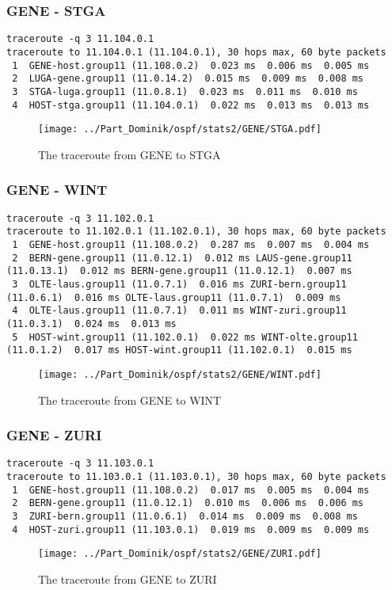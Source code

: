 \subsubsection{GENE - STGA}
\begin{lstlisting}
traceroute -q 3 11.104.0.1
traceroute to 11.104.0.1 (11.104.0.1), 30 hops max, 60 byte packets
 1  GENE-host.group11 (11.108.0.2)  0.023 ms  0.006 ms  0.005 ms
 2  LUGA-gene.group11 (11.0.14.2)  0.015 ms  0.009 ms  0.008 ms
 3  STGA-luga.group11 (11.0.8.1)  0.023 ms  0.011 ms  0.010 ms
 4  HOST-stga.group11 (11.104.0.1)  0.022 ms  0.013 ms  0.013 ms
\end{lstlisting}
\begin{figure}[H]
\centering
\texttt{[image: ../Part\_Dominik/ospf/stats2/GENE/STGA.pdf]}
\caption{The traceroute from GENE to STGA}
\end{figure}
\clearpage
\subsubsection{GENE - WINT}
\begin{lstlisting}
traceroute -q 3 11.102.0.1
traceroute to 11.102.0.1 (11.102.0.1), 30 hops max, 60 byte packets
 1  GENE-host.group11 (11.108.0.2)  0.287 ms  0.007 ms  0.004 ms
 2  BERN-gene.group11 (11.0.12.1)  0.012 ms LAUS-gene.group11 (11.0.13.1)  0.012 ms BERN-gene.group11 (11.0.12.1)  0.007 ms
 3  OLTE-laus.group11 (11.0.7.1)  0.016 ms ZURI-bern.group11 (11.0.6.1)  0.016 ms OLTE-laus.group11 (11.0.7.1)  0.009 ms
 4  OLTE-laus.group11 (11.0.7.1)  0.011 ms WINT-zuri.group11 (11.0.3.1)  0.024 ms  0.013 ms
 5  HOST-wint.group11 (11.102.0.1)  0.022 ms WINT-olte.group11 (11.0.1.2)  0.017 ms HOST-wint.group11 (11.102.0.1)  0.015 ms
\end{lstlisting}
\begin{figure}[H]
\centering
\texttt{[image: ../Part\_Dominik/ospf/stats2/GENE/WINT.pdf]}
\caption{The traceroute from GENE to WINT}
\end{figure}
\clearpage
\subsubsection{GENE - ZURI}
\begin{lstlisting}
traceroute -q 3 11.103.0.1
traceroute to 11.103.0.1 (11.103.0.1), 30 hops max, 60 byte packets
 1  GENE-host.group11 (11.108.0.2)  0.017 ms  0.005 ms  0.004 ms
 2  BERN-gene.group11 (11.0.12.1)  0.010 ms  0.006 ms  0.006 ms
 3  ZURI-bern.group11 (11.0.6.1)  0.014 ms  0.009 ms  0.008 ms
 4  HOST-zuri.group11 (11.103.0.1)  0.019 ms  0.009 ms  0.009 ms
\end{lstlisting}
\begin{figure}[H]
\centering
\texttt{[image: ../Part\_Dominik/ospf/stats2/GENE/ZURI.pdf]}
\caption{The traceroute from GENE to ZURI}
\end{figure}
\clearpage
